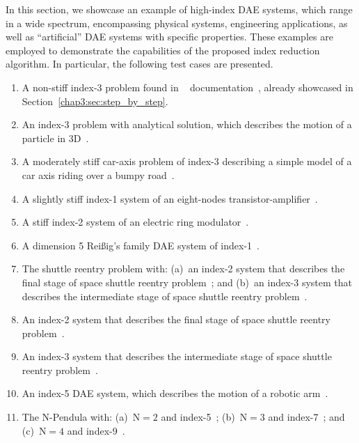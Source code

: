 In this section, we showcase an example of high-index \ac{DAE} systems, which range in a wide spectrum, encompassing physical systems, engineering applications, as well as ``artificial'' \ac{DAE} systems with specific properties. These examples are employed to demonstrate the capabilities of the proposed index reduction algorithm. In particular, the following test cases are presented.
%
\begin{enumerate}
  \setlength{\itemsep}{0.0em}
  \item A non-stiff index-3 problem found in \Wolfram{}~\Mathematica{} documentation~\cite{mathematica}, already showcased in Section~\ref{chap3:sec:step_by_step}.
  \item An index-3 problem with analytical solution, which describes the motion of a particle in 3D~\cite{campbell1995constraint}.
  \item A moderately stiff car-axis problem of index-3 describing a simple model of a car axis riding over a bumpy road~\cite{lioen1998test, mazzia2008test}.
  \item A slightly stiff index-1 system of an eight-nodes transistor-amplifier~\cite{lioen1998test, mazzia2008test}.
  \item A stiff index-2 system of an electric ring modulator~\cite{lioen1998test, mazzia2008test}.
  \item A dimension 5 Rei{\ss}ig's family \ac{DAE} system of index-1~\cite{reissig2000differential}.
  \item The shuttle reentry problem with: (a)~an index-2 system that describes the final stage of space shuttle reentry problem~\cite{brenan1995numerical}; and (b)~an index-3 system that describes the intermediate stage of space shuttle reentry problem~\cite{brenan1995numerical}.
  \item An index-2 system that describes the final stage of space shuttle reentry problem~\cite{brenan1995numerical}.
  \item An index-3 system that describes the intermediate stage of space shuttle reentry problem~\cite{brenan1995numerical}.
  \item An index-5 \ac{DAE} system, which describes the motion of a robotic arm~\cite{pryce1998solving}.
  \item The $\mathrm{N}$-Pendula with: (a)~$\mathrm{N} = 2$ and index-5~\cite{pryce1998solving}; (b)~$\mathrm{N} = 3$ and index-7~\cite{nedialkov2008solvingIII}; and (c)~$\mathrm{N} = 4$ and index-9~\cite{nedialkov2008solvingIII}.
\end{enumerate}
